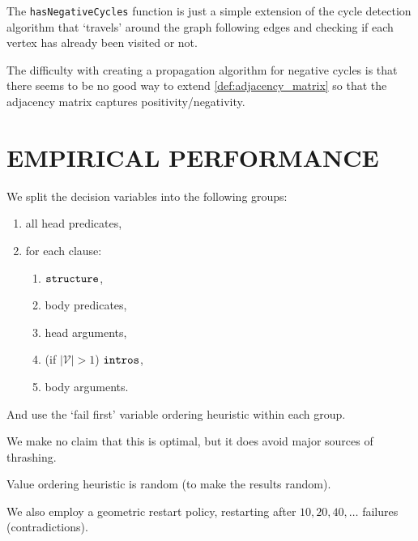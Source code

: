 \documentclass[letterpaper]{article}
\theoremstyle{definition}
\newcommand{\variable}[1]{\texttt{\textup{#1}}}
\newcommand{\variables}{\mathcal{V}}
\begin{document}
The \texttt{hasNegativeCycles} function is just a simple extension of the cycle
detection algorithm that `travels' around the graph following edges and
checking if each vertex has already been visited or not.

The difficulty with creating a propagation algorithm for negative cycles is that
there seems to be no good way to extend \cref{def:adjacency_matrix} so that the
adjacency matrix captures positivity/negativity.

\section{EMPIRICAL PERFORMANCE}

We split the decision variables into the following groups:
\begin{enumerate}
\item all head predicates,
\item for each clause:
  \begin{enumerate}
  \item $\variable{structure}$,
  \item body predicates,
  \item head arguments,
  \item (if $|\variables{}| > 1$) $\variable{intros}$,
  \item body arguments.
  \end{enumerate}
\end{enumerate}
And use the `fail first' variable ordering heuristic within each group.

We make no claim that this is optimal, but it does avoid major sources of
thrashing.


Value ordering heuristic is random (to make the results random).

We also employ a geometric restart policy, restarting after $10, 20, 40,\dots$
failures (contradictions).
\end{document}
